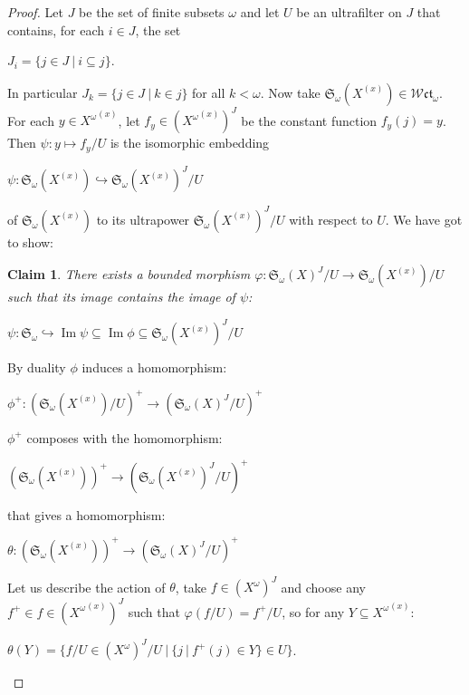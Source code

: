 \documentclass{article}
\theoremstyle{defin}
\theoremstyle{theorem}
\theoremstyle{claim}
\newtheorem{claim}{Claim}
\theoremstyle{prop}
\theoremstyle{lemma}
\theoremstyle{fact}
\theoremstyle{remark}
\theoremstyle{ex}
\theoremstyle{col}
\theoremstyle{question}
\begin{document}
\begin{proof}
Let $J$ be the set of finite subsets $\omega$ and let $U$ be an ultrafilter on $J$ that contains, for each $i \in J$, the set
\begin{center}
$J_i = \{ j \in J \: | \: i \subseteq j \}$.
\end{center}
In particular $J_k = \{ j \in J \: | \: k \in j \}$ for all $k < \omega$. Now take $\mathfrak{S}_{\omega}(X^{(x)}) \in \mathcal{W}\mathfrak{ct}_{\omega}$. For each $y \in {X^{\omega}}^{(x)}$, let $f_y \in ({X^{\omega}}^{(x)})^{J}$ be the constant function $f_y(j) = y$. Then $\psi : y \mapsto f_y / U$ is the isomorphic embedding
\begin{center}
$\psi : \mathfrak{S}_{\omega}(X^{(x)}) \hookrightarrow \mathfrak{S}_{\omega}(X^{(x)})^J/U$
\end{center}
of $\mathfrak{S}_{\omega}(X^{(x)})$ to its ultrapower $\mathfrak{S}_{\omega}(X^{(x)})^J/U$ with respect to $U$. We have got to show:
\begin{claim} \label{claim}
There exists a bounded morphism $\varphi : \mathfrak{S}_{\omega}(X)^J/U \to \mathfrak{S}_{\omega}(X^{(x)})/U$ such that its image contains the image of $\psi$:
\begin{center}
$\psi : \mathfrak{S}_{\omega} \hookrightarrow \operatorname{Im}\psi \subseteq \operatorname{Im}\phi \subseteq \mathfrak{S}_{\omega}(X^{(x)})^J / U $
\end{center}
\end{claim}

By duality $\phi$ induces a homomorphism:
\begin{center}
$\phi^+ : (\mathfrak{S}_{\omega}(X^{(x)})/U)^+ \to (\mathfrak{S}_{\omega}(X)^J/U)^+$
\end{center}
$\phi^+$ composes with the homomorphism:
\begin{center}
$(\mathfrak{S}_{\omega}(X^{(x)}))^+ \to (\mathfrak{S}_{\omega}(X^{(x)})^J/U)^+$
\end{center}
that gives a homomorphism:
\begin{center}
$\theta : (\mathfrak{S}_{\omega}(X^{(x)}))^+ \to (\mathfrak{S}_{\omega}(X)^J/U)^+$
\end{center}
Let us describe the action of $\theta$, take $f \in (X^{\omega})^J$ and choose any $f^+ \in f \in ({X^{\omega}}^{(x)})^J$ such that $\varphi(f/U) = f^+/U$, so for any $Y \subseteq {X^{\omega}}^{(x)}$:
\begin{center}
$\theta(Y) = \{ f/U \in (X^{\omega})^J/U \: | \: \{ j \: | \: f^+(j) \in Y \} \in U \}$.
\end{center}


\end{proof}
\end{document}
